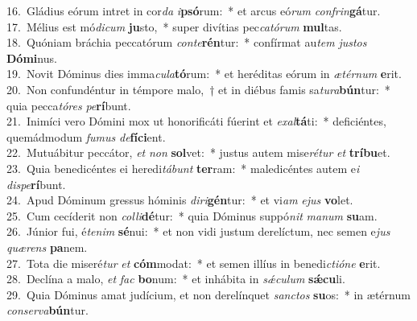 {16.~}Gládius eórum intret in cor\textit{da} \textit{i}\textbf{psó}rum:~* et arcus eó\textit{rum} \textit{con}\textit{frin}\textbf{gá}tur.\\
{17.~}Mélius est mó\textit{di}\textit{cum} \textbf{ju}sto,~* super divítias pec\textit{ca}\textit{tó}\textit{rum} \textbf{mul}tas.\\
{18.~}Quóniam bráchia peccatórum \textit{con}\textit{te}\textbf{rén}tur:~* confírmat au\textit{tem} \textit{ju}\textit{stos} \textbf{Dó}\textbf{mi}nus.\\
{19.~}Novit Dóminus dies imma\textit{cu}\textit{la}\textbf{tó}rum:~* et heréditas eórum in \textit{æ}\textit{tér}\textit{num} \textbf{e}rit.\\
{20.~}Non confundéntur in témpore malo,~† et in diébus famis sa\textit{tu}\textit{ra}\textbf{bún}tur:~* quia pecca\textit{tó}\textit{res} \textit{pe}\textbf{rí}bunt.\\
{21.~}Inimíci vero Dómini mox ut honorificáti fúerint et \textit{e}\textit{xal}\textbf{tá}ti:~* deficiéntes, quemádmodum \textit{fu}\textit{mus} \textit{de}\textbf{fí}\textbf{ci}ent.\\
{22.~}Mutuábitur peccátor, \textit{et} \textit{non} \textbf{sol}vet:~* justus autem mise\textit{ré}\textit{tur} \textit{et} \textbf{trí}\textbf{bu}et.\\
{23.~}Quia benedicéntes ei heredi\textit{tá}\textit{bunt} \textbf{ter}ram:~* maledicéntes autem e\textit{i} \textit{di}\textit{spe}\textbf{rí}bunt.\\
{24.~}Apud Dóminum gressus hóminis \textit{di}\textit{ri}\textbf{gén}tur:~* et vi\textit{am} \textit{e}\textit{jus} \textbf{vo}let.\\
{25.~}Cum cecíderit non \textit{col}\textit{li}\textbf{dé}tur:~* quia Dóminus suppó\textit{nit} \textit{ma}\textit{num} \textbf{su}am.\\
{26.~}Júnior fui, é\textit{te}\textit{nim} \textbf{sé}nui:~* et non vidi justum derelíctum, nec semen e\textit{jus} \textit{quæ}\textit{rens} \textbf{pa}nem.\\
{27.~}Tota die miseré\textit{tur} \textit{et} \textbf{cóm}modat:~* et semen illíus in benedi\textit{cti}\textit{ó}\textit{ne} \textbf{e}rit.\\
{28.~}Declína a malo, \textit{et} \textit{fac} \textbf{bo}num:~* et inhábita in \textit{sǽ}\textit{cu}\textit{lum} \textbf{sǽ}\textbf{cu}li.\\
{29.~}Quia Dóminus amat judícium, et non derelínquet \textit{san}\textit{ctos} \textbf{su}os:~* in ætérnum \textit{con}\textit{ser}\textit{va}\textbf{bún}tur.\\
